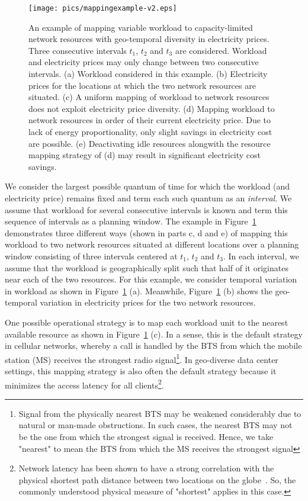 \begin{figure}
\centering
\texttt{[image: pics/mappingexample-v2.eps]}
\caption{An example of mapping variable workload to capacity-limited network resources with geo-temporal diversity in electricity prices. Three consecutive intervals $t_1$, $t_2$ and $t_3$ are considered. Workload and electricity prices may only change between two consecutive intervals. (a) Workload considered in this example. (b) Electricity prices for the locations at which the two network resources are situated. (c) A uniform mapping of workload to network resources does not exploit electricity price diversity. (d) Mapping workload to network resources in order of their current electricity price. Due to lack of energy proportionality, only slight savings in electricity cost are possible. (e) Deactivating idle resources alongwith the resource mapping strategy of (d) may result in significant electricity cost savings.}
\label{fig:mappingexample}
\end{figure}

We consider the largest possible quantum of time for which the workload (and electricity price) remains fixed and term each such quantum as an \textit{interval}. We assume that workload for several consecutive intervals is known and term this sequence of intervals as a planning window. The example in Figure~\ref{fig:mappingexample} demonstrates three different ways (shown in parts c, d and e) of mapping this workload to two network resources situated at different locations over a planning window consisting of three intervals centered at $t_1$, $t_2$ and $t_3$. In each interval, we assume that the workload is geographically split such that half of it originates near each of the two resources. For this example, we consider temporal variation in workload as shown in Figure~\ref{fig:mappingexample} (a). Meanwhile, Figure~\ref{fig:mappingexample} (b) shows the geo-temporal variation in electricity prices for the two network resources.

One possible operational strategy is to map each workload unit to the nearest available resource as shown in Figure~\ref{fig:mappingexample} (c). In a sense, this is the default strategy in cellular networks, whereby a call is handled by the BTS from which the mobile station (MS) receives the strongest radio signal\footnote{Signal from the physically nearest BTS may be weakened considerably due to natural or man-made obstructions. In such cases, the nearest BTS may not be the one from which the strongest signal is received. Hence, we take "nearest" to mean the BTS from which the MS receives the strongest signal}. In geo-diverse data center settings, this mapping strategy is also often the default strategy because it minimizes the access latency for all clients\footnote{Network latency has been shown to have a strong correlation with the physical shortest path distance between two locations on the globe~\cite{dina:p2pdelay:infocom:2004}. So, the commonly understood physical measure of "shortest" applies in this case.}. 

